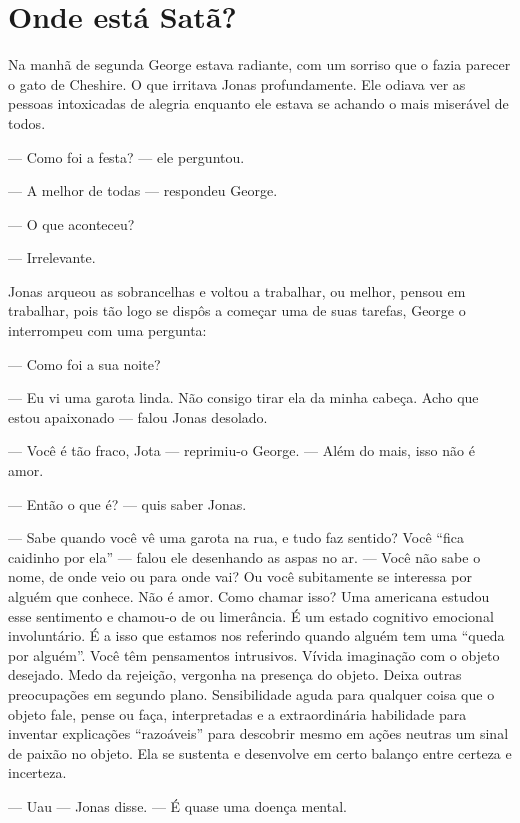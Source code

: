 \chapter{Onde está Satã?}

Na manhã de segunda\mudanca{,} George estava radiante, com um sorriso que o fazia parecer o gato de Cheshire. O que irritava Jonas profundamente. Ele odiava ver as pessoas intoxicadas de alegria enquanto ele estava se achando o mais miserável de todos.

--- Como foi a festa? --- ele perguntou.

--- A melhor de todas --- respondeu George.

--- O que aconteceu?

--- Irrelevante.

Jonas arqueou as sobrancelhas e voltou a trabalhar, ou melhor, pensou em trabalhar, pois tão logo se dispôs a começar uma de suas tarefas, George o interrompeu com uma pergunta:

--- Como foi a sua noite?

--- Eu vi uma garota linda. Não consigo tirar ela da minha cabeça. Acho que estou apaixonado --- falou Jonas desolado.

--- Você é tão fraco, Jota --- reprimiu-o George. --- Além do mais, isso não é amor.

--- Então o que é? --- quis saber Jonas.

--- Sabe quando você vê uma garota na rua, e tudo faz sentido? Você ``fica caidinho por ela'' --- falou ele desenhando as aspas no ar. --- Você não sabe o nome, de onde veio ou para onde vai? Ou você subitamente se interessa por alguém que conhece. Não é amor. Como chamar isso? Uma americana estudou esse sentimento e chamou-o de  ou limerância. É um estado cognitivo emocional involuntário. É a isso que estamos nos referindo quando alguém tem uma ``queda por alguém''. Você têm pensamentos intrusivos. Vívida imaginação com o objeto desejado. Medo da rejeição, vergonha na presença do objeto. Deixa outras preocupações em segundo plano. Sensibilidade aguda para qualquer coisa que o objeto fale, pense ou faça,  interpretadas\mudanca{,} e a extraordinária habilidade para inventar explicações ``razoáveis''  para descobrir mesmo em ações neutras um sinal de paixão no objeto. Ela se sustenta e desenvolve em certo balanço entre certeza e incerteza.

--- Uau --- Jonas disse. --- É quase uma doença mental.

